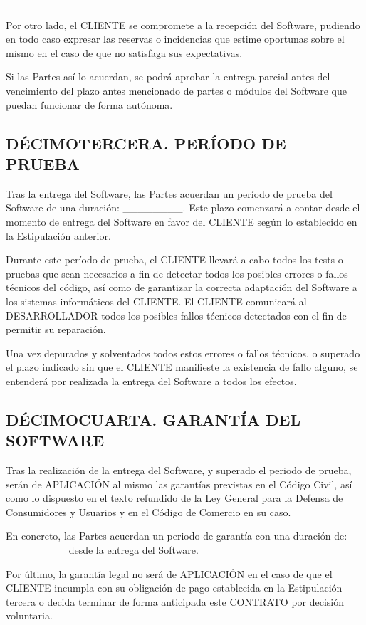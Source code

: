 \documentclass[a4paper,11pt]{report}
\begin{document}
	\_\_\_\_\_\_\_\_

	Por otro lado, el CLIENTE se compromete a la recepción del Software,
	pudiendo en todo caso expresar las reservas o incidencias que estime
	oportunas sobre el mismo en el caso de que no satisfaga sus
	expectativas.

	Si las Partes así lo acuerdan, se podrá aprobar la entrega parcial antes
	del vencimiento del plazo antes mencionado de partes o módulos del
	Software que puedan funcionar de forma autónoma.

	\subsection*{DÉCIMOTERCERA. PERÍODO DE PRUEBA}

	Tras la entrega del Software, las Partes acuerdan un período de prueba
	del Software de una duración: \_\_\_\_\_\_\_\_. Este plazo comenzará a contar
	desde el momento de entrega del Software en favor del CLIENTE según lo
	establecido en la Estipulación anterior.

	Durante este período de prueba, el CLIENTE llevará a cabo todos los
	tests o pruebas que sean necesarios a fin de detectar todos los posibles
	errores o fallos técnicos del código, así como de garantizar la correcta
	adaptación del Software a los sistemas informáticos del CLIENTE. El
	CLIENTE comunicará al DESARROLLADOR todos los posibles fallos técnicos
	detectados con el fin de permitir su reparación.

	Una vez depurados y solventados todos estos errores o fallos técnicos, o
	superado el plazo indicado sin que el CLIENTE manifieste la existencia
	de fallo alguno, se entenderá por realizada la entrega del Software a
	todos los efectos.

	\subsection*{DÉCIMOCUARTA. GARANTÍA DEL SOFTWARE}

	Tras la realización de la entrega del Software, y superado el periodo de
	prueba, serán de APLICACIÓN al mismo las garantías previstas en el
	Código Civil, así como lo dispuesto en el texto refundido de la Ley
	General para la Defensa de Consumidores y Usuarios y en el Código de
	Comercio en su caso.

	En concreto, las Partes acuerdan un periodo de garantía con una duración
	de: \_\_\_\_\_\_\_\_ desde la entrega del Software.

	Por último, la garantía legal no será de APLICACIÓN en el caso de que el
	CLIENTE incumpla con su obligación de pago establecida en la
	Estipulación tercera o decida terminar de forma anticipada este CONTRATO
	por decisión voluntaria.
\end{document}
